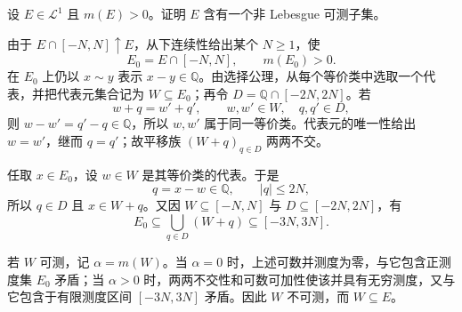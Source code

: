\begin{exercise}\label{b1:ex:0309}
设 \(E\in\mathcal L^1\) 且 \(m(E)>0\)。证明 \(E\) 含有一个非 Lebesgue 可测子集。
\end{exercise}
\begin{solution}
由于 \(E\cap[-N,N]\uparrow E\)，从下连续性给出某个 \(N\geq1\)，使
\[
E_0=E\cap[-N,N],
\qquad
m(E_0)>0.
\]
在 \(E_0\) 上仍以 \(x\sim y\) 表示 \(x-y\in\mathbb Q\)。由选择公理，从每个等价类中选取一个代表，并把代表元集合记为 \(W\subseteq E_0\)；再令 \(D=\mathbb Q\cap[-2N,2N]\)。若
\[
w+q=w'+q',
\qquad
w,w'\in W,
\quad q,q'\in D,
\]
则 \(w-w'=q'-q\in\mathbb Q\)，所以 \(w,w'\) 属于同一等价类。代表元的唯一性给出 \(w=w'\)，继而 \(q=q'\)；故平移族 \((W+q)_{q\in D}\) 两两不交。

任取 \(x\in E_0\)，设 \(w\in W\) 是其等价类的代表。于是
\[
q=x-w\in\mathbb Q,
\qquad
|q|\leq2N,
\]
所以 \(q\in D\) 且 \(x\in W+q\)。又因 \(W\subseteq[-N,N]\) 与 \(D\subseteq[-2N,2N]\)，有
\[
E_0\subseteq\bigcup_{q\in D}(W+q)
\subseteq[-3N,3N].
\]

若 \(W\) 可测，记 \(\alpha=m(W)\)。当 \(\alpha=0\) 时，上述可数并测度为零，与它包含正测度集 \(E_0\) 矛盾；当 \(\alpha>0\) 时，两两不交性和可数可加性使该并具有无穷测度，又与它包含于有限测度区间 \([-3N,3N]\) 矛盾。因此 \(W\) 不可测，而 \(W\subseteq E\)。
\end{solution}

